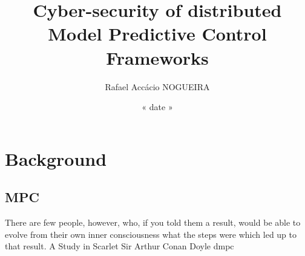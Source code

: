 \documentclass{these-dbl}
\author{Rafael Accácio NOGUEIRA}
\title{Cyber-security of distributed Model Predictive Control Frameworks}
\date{« date »}
\begin{document}
\maketitle

% 



% 


% 

\cleartooddpage[\thispagestyle{empty}]
\printglossary[type=\acronymtype,title=List of Acronyms]

\cleartooddpage[\thispagestyle{empty}]
\listoffigures
{}
\cleartooddpage[\thispagestyle{empty}]
\listoftables

\cleartooddpage[\thispagestyle{empty}]
\printglossary

% 


% 

\part{Background}
\chapter{MPC}
There are few people, however, who, if you told them a result, would be able to evolve from their own inner consciousness what the steps were which led up to that result.
A Study in Scarlet
Sir Arthur Conan Doyle
\gls{dmpc}
\end{document}

